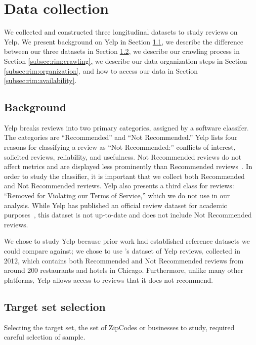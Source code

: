 \section{Data collection} \label{sec:rim:dataset}

We collected and constructed three longitudinal datasets to study reviews on Yelp. We present background on Yelp in Section \ref{subsec:rim:background}, we describe the difference between our three datasets in Section \ref{subsec:rim:target_set}, we describe our crawling process in Section \ref{subsec:rim:crawling}, we describe our data organization steps in Section \ref{subsec:rim:organization}, and how to access our data in Section \ref{subsec:rim:availability}.

\subsection{Background} \label{subsec:rim:background}

Yelp breaks reviews into two primary categories, assigned by a software classifer. The categories are ``Recommended'' and ``Not Recommended.'' Yelp lists four reasons for classifying a review as ``Not Recommended:'' conflicts of interest, solicited reviews, reliability, and usefulness. Not Recommended reviews do not affect metrics and are displayed less prominently than Recommended reviews~\cite{yelpwhyrec,yelprecommendationsoftware,yelpstarrating}. In order to study the classifier, it is important that we collect both Recommended and Not Recommended reviews. Yelp also presents a third class for reviews: ``Removed for Violating our Terms of Service,'' which we do not use in our analysis. While Yelp has published an official review dataset for academic purposes~\cite{yelpacademicdataset}, this dataset is not up-to-date and does not include Not Recommended reviews.

We chose to study Yelp because prior work had established reference datasets we could compare against; we chose to use \citet{mukherjee2013yelp}'s dataset of Yelp reviews, collected in 2012, which contains both Recommended and Not Recommended reviews from around 200 restaurants and hotels in Chicago. Furthermore, unlike many other platforms, Yelp allows access to reviews that it does not recommend.

\subsection{Target set selection} \label{subsec:rim:target_set}
Selecting the target set, the set of ZipCodes or businesses to study, required careful selection of sample.


